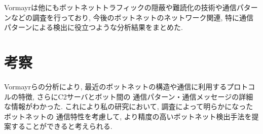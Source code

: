 \documentclass[twocolumn,9]{ltjsarticle}
\begin{document}
Vormayrは他にもボットネットトラフィックの隠蔽や難読化の技術や通信パターンなどの調査を行っており, 
今後のボットネットのネットワーク関連, 特に通信パターンによる検出に役立つような分析結果をまとめた. 

\section{考察}
Vormayrらの分析により, 最近のボットネットの構造や通信に利用するプロトコルの特徴, さらにC2サーバとボット間の
通信パターン・通信メッセージの詳細な情報がわかった. これにより私の研究において, 調査によって明らかになったボットネットの
通信特性を考慮して, より精度の高いボットネット検出手法を提案することができると考えられる. 



\end{document}
